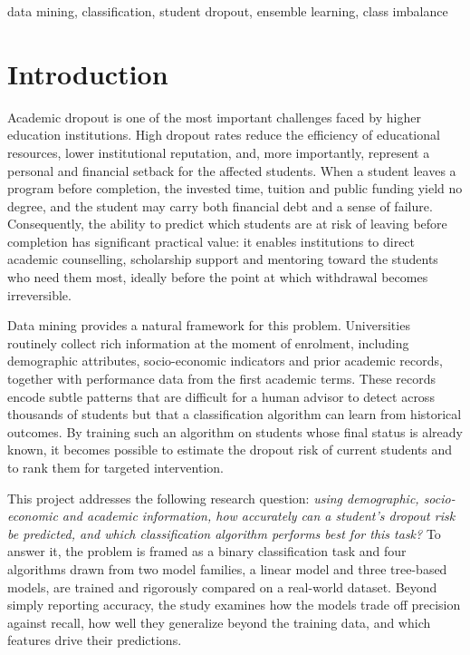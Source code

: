 \documentclass[conference]{IEEEtran}
\begin{document}
	\begin{IEEEkeywords}
		data mining, classification, student dropout, ensemble learning, class imbalance
	\end{IEEEkeywords}
	
	\section{Introduction}
	\label{sec:introduction}
	
	Academic dropout is one of the most important challenges faced by higher education institutions. High dropout rates reduce the efficiency of educational resources, lower institutional reputation, and, more importantly, represent a personal and financial setback for the affected students. When a student leaves a program before completion, the invested time, tuition and public funding yield no degree, and the student may carry both financial debt and a sense of failure. Consequently, the ability to predict which students are at risk of leaving before completion has significant practical value: it enables institutions to direct academic counselling, scholarship support and mentoring toward the students who need them most, ideally before the point at which withdrawal becomes irreversible.
	
	Data mining provides a natural framework for this problem. Universities routinely collect rich information at the moment of enrolment, including demographic attributes, socio-economic indicators and prior academic records, together with performance data from the first academic terms. These records encode subtle patterns that are difficult for a human advisor to detect across thousands of students but that a classification algorithm can learn from historical outcomes. By training such an algorithm on students whose final status is already known, it becomes possible to estimate the dropout risk of current students and to rank them for targeted intervention.
	
	This project addresses the following research question: \textit{using demographic, socio-economic and academic information, how accurately can a student's dropout risk be predicted, and which classification algorithm performs best for this task?} To answer it, the problem is framed as a binary classification task and four algorithms drawn from two model families, a linear model and three tree-based models, are trained and rigorously compared on a real-world dataset. Beyond simply reporting accuracy, the study examines how the models trade off precision against recall, how well they generalize beyond the training data, and which features drive their predictions.
	
\end{document}
